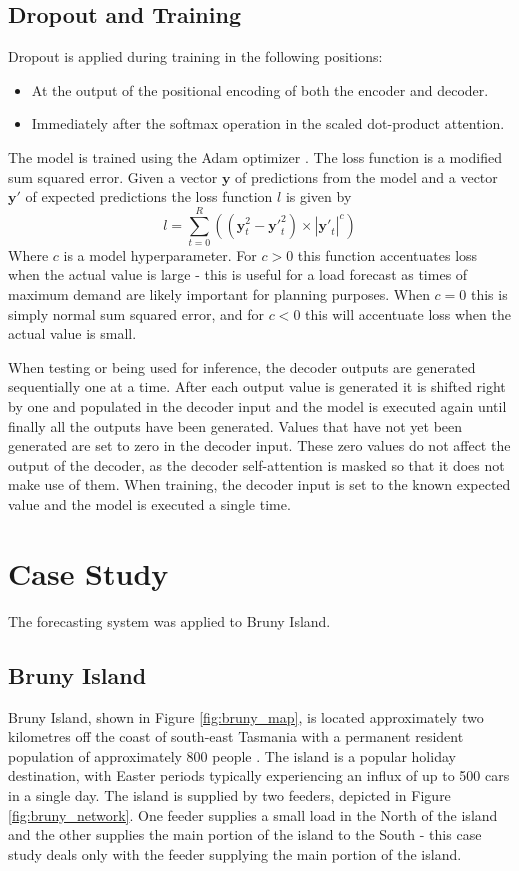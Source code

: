 \documentclass[conference]{IEEEtran}
\begin{document}
\subsection{Dropout and Training}
Dropout is applied during training in the following positions:
\begin{itemize}
	\item At the output of the positional encoding of both the encoder and decoder.
	\item Immediately after the softmax operation in the scaled dot-product attention.
\end{itemize}
The model is trained using the Adam optimizer \cite{Kingma2014}.
The loss function is a modified sum squared error.
Given a vector $\boldsymbol{y}$ of predictions from the model and a vector $\boldsymbol{y'}$ of expected predictions the loss function $l$ is given by 
\begin{equation}
l = \sum_{t=0}^{R}((\boldsymbol{y}_t^2 - \boldsymbol{y'}_t^2) \times |\boldsymbol{y'}_t|^c)
\end{equation}
Where $c$ is a model hyperparameter.
For $c>0$ this function accentuates loss when the actual value is large - this is useful for a load forecast as times of maximum demand are likely important for planning purposes.
When $c=0$ this is simply normal sum squared error, and for $c<0$ this will accentuate loss when the actual value is small.

When testing or being used for inference, the decoder outputs are generated sequentially one at a time.
After each output value is generated it is shifted right by one and populated in the decoder input and the model is executed again until finally all the outputs have been generated.
Values that have not yet been generated are set to zero in the decoder input.
These zero values do not affect the output of the decoder, as the decoder self-attention is masked so that it does not make use of them.
When training, the decoder input is set to the known expected value and the model is executed a single time.


\section{Case Study}
The forecasting system was applied to Bruny Island.

\subsection{Bruny Island}
Bruny Island, shown in Figure \ref{fig:bruny_map}, is located approximately two kilometres off the coast of south-east Tasmania with a permanent resident population of approximately 800 people \cite{census2016}.
The island is a popular holiday destination, with Easter periods typically experiencing an influx of up to 500 cars in a single day.
The island is supplied by two feeders, depicted in Figure \ref{fig:bruny_network}.
One feeder supplies a small load in the North of the island and the other supplies the main portion of the island to the South - this case study deals only with the feeder supplying the main portion of the island.
\end{document}
